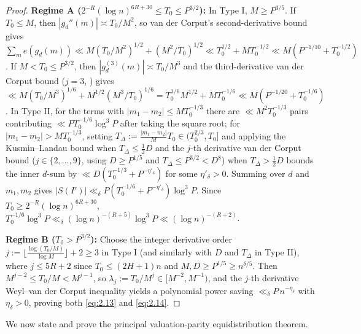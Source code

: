 \documentclass[11pt,reqno]{amsart}
\theoremstyle{remark}
\numberwithin{equation}{section}
\begin{document}
\begin{proof}
\noindent\textbf{Regime A ($2^{-R}(\log n)^{6R+30} \le T_0 \le P^{3/2}$):}
In Type I, $M \ge P^{3/5}$. If $T_0 \le M$, then $|g_d''(m)| \asymp T_0 / M^2$, so van der Corput's second-derivative bound \cite[Corollary~8.13]{IwaniecKowalski2004} gives $\sum_m e(g_d(m)) \ll M(T_0/M^2)^{1/2} + (M^2/T_0)^{1/2} \ll T_0^{1/2} + MT_0^{-1/2} \ll M(P^{-1/10} + T_0^{-1/2})$. If $M < T_0 \le P^{3/2}$, then $|g_d^{(3)}(m)| \asymp T_0/M^3$ and the third-derivative van der Corput bound ($j = 3$, \cite[Corollary~8.13]{IwaniecKowalski2004}) gives $\ll M(T_0/M^3)^{1/6} + M^{1/2}(M^3/T_0)^{1/6} = T_0^{1/6}M^{1/2} + MT_0^{-1/6} \ll M(P^{-1/20} + T_0^{-1/6})$. In Type II, for the terms with $|m_1 - m_2| \le MT_0^{-1/3}$ there are $\ll M^2 T_0^{-1/3}$ pairs contributing $\ll PT_0^{-1/6}\log^3 P$ after taking the square root; for $|m_1 - m_2| > MT_0^{-1/3}$, setting $T_\Delta := \frac{|m_1 - m_2|}{M} T_0 \in (T_0^{2/3}, T_0]$ and applying the Kusmin--Landau bound \cite[Corollary~8.11]{IwaniecKowalski2004} when $T_\Delta \le \frac{1}{2}D$ and the $j$-th derivative van der Corput bound ($j \in \{2, \dots, 9\}$, using $D \ge P^{1/5}$ and $T_\Delta \le P^{3/2} < D^8$) when $T_\Delta > \frac{1}{2}D$ bounds the inner $d$-sum by $\ll D(T_0^{-1/3} + P^{-\eta'_\delta})$ for some $\eta'_\delta > 0$. Summing over $d$ and $m_1, m_2$ gives $|S(I')| \ll_\delta P(T_0^{-1/6} + P^{-\eta'_\delta})\log^3 P$. Since $T_0 \ge 2^{-R}(\log n)^{6R+30}$, $T_0^{-1/6}\log^3 P \ll_\delta (\log n)^{-(R+5)}\log^3 P \ll (\log n)^{-(R+2)}$.

\noindent\textbf{Regime B ($T_0 > P^{3/2}$):}
Choose the integer derivative order $j := \lfloor \frac{\log(T_0/M)}{\log M} \rfloor + 2 \ge 3$ in Type I (and similarly with $D$ and $T_\Delta$ in Type II), where $j \le 5R + 2$ since $T_0 \le (2H + 1)n$ and $M, D \ge P^{1/5} \ge n^{\delta/5}$. Then $M^{j-2} \le T_0/M < M^{j-1}$, so $\lambda_j := T_0/M^j \in [M^{-2}, M^{-1})$, and the $j$-th derivative Weyl--van der Corput inequality \cite[Theorem~8.25]{IwaniecKowalski2004} yields a polynomial power saving $\ll_\delta P\,n^{-\eta_\delta}$ with $\eta_\delta > 0$, proving both \eqref{eq:2.13} and \eqref{eq:2.14}.
\end{proof}

We now state and prove the principal valuation-parity equidistribution theorem.
\end{document}
